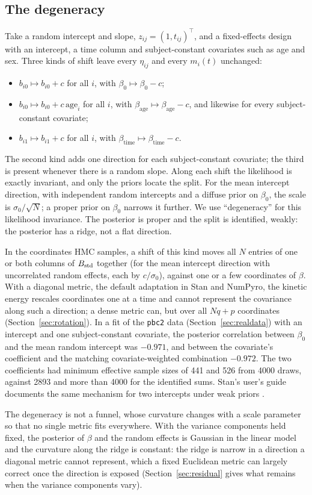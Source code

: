 \subsection{The degeneracy}\label{sec:degeneracy}

Take a random intercept and slope, $z_{ij} = (1, t_{ij})^{\top}$, and a
fixed-effects design with an intercept, a time column and subject-constant
covariates such as age and sex. Three kinds of shift leave every
$\eta_{ij}$ and every $m_i(t)$ unchanged:
\begin{itemize}
\item $b_{i0} \mapsto b_{i0} + c$ for all $i$, with $\beta_0 \mapsto
\beta_0 - c$;
\item $b_{i0} \mapsto b_{i0} + c\,\mathrm{age}_i$ for all $i$, with
$\beta_{\mathrm{age}} \mapsto \beta_{\mathrm{age}} - c$, and likewise for
every subject-constant covariate;
\item $b_{i1} \mapsto b_{i1} + c$ for all $i$, with $\beta_{\mathrm{time}}
\mapsto \beta_{\mathrm{time}} - c$.
\end{itemize}
The second kind adds one direction for each subject-constant covariate;
the third is present whenever there is a random slope. Along each shift the likelihood is exactly invariant, and only the priors
locate the split. For the mean intercept direction, with independent
random intercepts and a diffuse prior on $\beta_0$, the scale is
$\sigma_0/\sqrt{N}$; a proper prior on $\beta_0$ narrows it further. We use
``degeneracy'' for this likelihood invariance. The posterior is proper and
the split is identified, weakly: the posterior has a ridge, not a flat
direction.

In the coordinates HMC samples, a shift of this kind moves all $N$
entries of one or both columns of $B_{\mathrm{std}}$ together (for the mean intercept
direction with uncorrelated random effects, each by $c/\sigma_0$), against
one or a few coordinates of $\beta$. With a diagonal metric, the default
adaptation in Stan and NumPyro, the kinetic energy rescales coordinates one
at a time and cannot represent the covariance along such a direction;
a dense metric can, but over all $Nq + p$ coordinates
(Section~\ref{sec:rotation}). In a fit of the \texttt{pbc2} data
(Section~\ref{sec:realdata}) with an intercept and one subject-constant
covariate, the posterior correlation between $\beta_0$ and the mean random
intercept was $-0.971$, and between the covariate's coefficient and the
matching covariate-weighted combination $-0.972$. The two coefficients had
minimum effective sample sizes of 441 and 526 from 4000 draws, against
2893 and more than 4000 for the identified sums. Stan's user's guide
documents the same mechanism for two intercepts under weak priors
\citep{stanug}.

The degeneracy is not a funnel, whose curvature changes with a scale
parameter so that no single metric fits everywhere. With the variance
components held fixed, the posterior of $\beta$ and the random effects is
Gaussian in the linear model and the curvature along the ridge is
constant: the ridge is narrow in a direction a diagonal metric cannot
represent, which a fixed Euclidean metric can largely correct once the
direction is exposed (Section~\ref{sec:residual} gives what remains when
the variance components vary).
